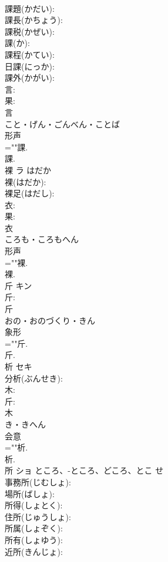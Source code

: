 \documentclass[8pt]{extreport}
\begin{document}
\begin{CJK}{UTF8}{min}
\\	課題(かだい): 
\\	課長(かちょう): 
\\	課税(かぜい): 
\\	課(か): 
\\	課程(かてい): 
\\	日課(にっか): 
\\	課外(かがい): 
\\	言: 
\\	果: 
\\	言	
\\	こと・げん・ごんべん・ことば	
\\	形声 
\\	=""課.
\\	課.
\\	裸	ラ	はだか		
\\	裸(はだか): 
\\	裸足(はだし): 
\\	衣: 
\\	果: 
\\	衣	
\\	ころも・ころもへん	
\\	形声 
\\	=""裸.
\\	裸.
\\	斤	キン			
\\	斤: 
\\	斤	
\\	おの・おのづくり・きん	
\\	象形 
\\	=""斤.
\\	斤.
\\	析	セキ			
\\	分析(ぶんせき): 
\\	木: 
\\	斤: 
\\	木	
\\	き・きへん	
\\	会意 
\\	=""析.
\\	析.
\\	所	ショ	ところ、-ところ、どころ、とこ	せ	
\\	事務所(じむしょ): 
\\	場所(ばしょ): 
\\	所得(しょとく): 
\\	住所(じゅうしょ): 
\\	所属(しょぞく): 
\\	所有(しょゆう): 
\\	近所(きんじょ): 

\end{CJK}
\end{document}
